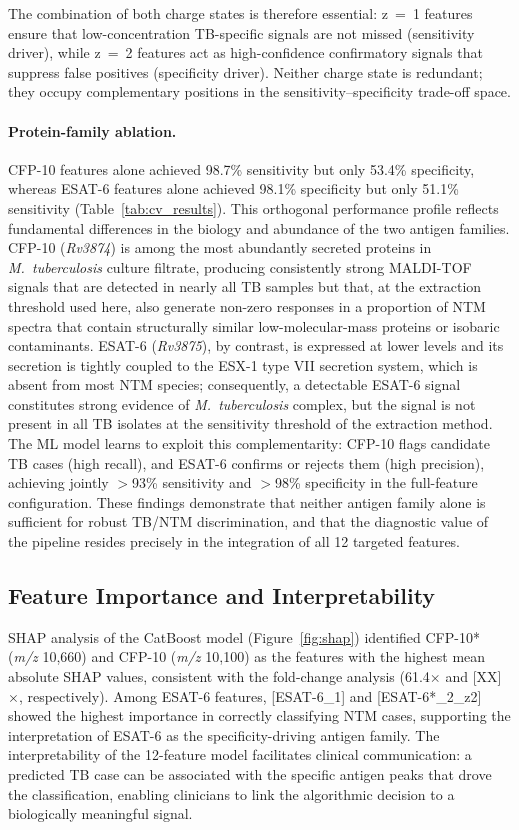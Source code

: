 \documentclass[journal=ancham, manuscript=article, layout=traditional]{achemso}
\begin{document}
The combination of both charge states is therefore essential:
z~=~1 features ensure that low-concentration TB-specific signals
are not missed (sensitivity driver), while z~=~2 features act as
high-confidence confirmatory signals that suppress false positives
(specificity driver).
Neither charge state is redundant; they occupy complementary
positions in the sensitivity--specificity trade-off space.

\paragraph{Protein-family ablation.}
CFP-10 features alone achieved 98.7\% sensitivity but only 53.4\%
specificity, whereas ESAT-6 features alone achieved 98.1\%
specificity but only 51.1\% sensitivity
(Table~\ref{tab:cv_results}).
This orthogonal performance profile reflects fundamental differences
in the biology and abundance of the two antigen families.
CFP-10 (\textit{Rv3874}) is among the most abundantly secreted
proteins in \textit{M.~tuberculosis} culture filtrate,\cite{Sorensen1995}
producing consistently strong MALDI-TOF signals that are detected
in nearly all TB samples but that, at the extraction threshold
used here, also generate non-zero responses in a proportion of
NTM spectra that contain structurally similar low-molecular-mass
proteins or isobaric contaminants.
ESAT-6 (\textit{Rv3875}), by contrast, is expressed at lower
levels and its secretion is tightly coupled to the ESX-1 type VII
secretion system, which is absent from most NTM
species;\cite{Berthet1998} consequently, a detectable ESAT-6 signal
constitutes strong evidence of \textit{M.~tuberculosis} complex,
but the signal is not present in all TB isolates at the sensitivity
threshold of the extraction method.
The ML model learns to exploit this complementarity: CFP-10 flags
candidate TB cases (high recall), and ESAT-6 confirms or rejects
them (high precision), achieving jointly $>$93\% sensitivity and
$>$98\% specificity in the full-feature configuration.
These findings demonstrate that neither antigen family alone is
sufficient for robust TB/NTM discrimination, and that the diagnostic
value of the pipeline resides precisely in the integration of all
12 targeted features.

\subsection{Feature Importance and Interpretability}

SHAP analysis of the CatBoost model (Figure~\ref{fig:shap}) identified
CFP-10* (\textit{m/z} 10,660) and CFP-10 (\textit{m/z} 10,100) as
the features with the highest mean absolute SHAP values, consistent
with the fold-change analysis (61.4$\times$ and [XX]$\times$,
respectively).
Among ESAT-6 features, [ESAT-6\_1] and [ESAT-6*\_2\_z2] showed the
highest importance in correctly classifying NTM cases,
supporting the interpretation of ESAT-6 as the specificity-driving
antigen family.
The interpretability of the 12-feature model facilitates clinical
communication: a predicted TB case can be associated with the
specific antigen peaks that drove the classification,
enabling clinicians to link the algorithmic decision to a
biologically meaningful signal.
\end{document}
